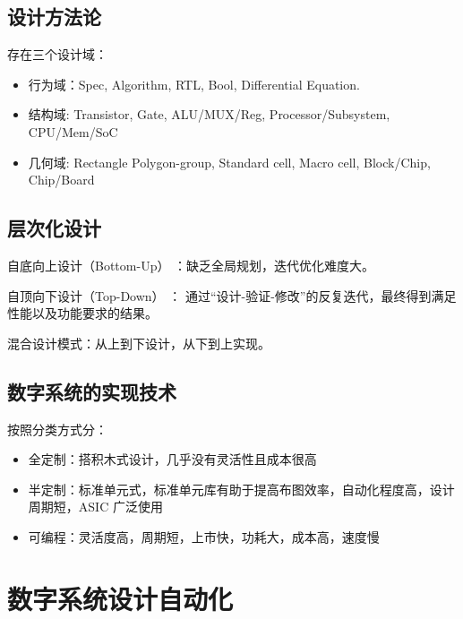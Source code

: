 \documentclass[cn,11pt,chinese,black,simple]{../elegantbook}
\begin{document}
\subsection{设计方法论}

存在三个设计域：

\begin{itemize}
    \item 行为域：Spec, Algorithm, RTL, Bool, Differential Equation.
    \item 结构域: Transistor, Gate, ALU/MUX/Reg, Processor/Subsystem, CPU/Mem/SoC 
    \item 几何域: Rectangle Polygon-group, Standard cell, Macro cell, Block/Chip, Chip/Board
\end{itemize}

\subsection{层次化设计}

自底向上设计（Bottom-Up） ：缺乏全局规划，迭代优化难度大。

自顶向下设计（Top-Down） ： 通过“设计-验证-修改”的反复迭代，最终得到满足性能以及功能要求的结果。

混合设计模式：从上到下设计，从下到上实现。

\subsection{数字系统的实现技术}

按照分类方式分：

\begin{itemize}
    \item 全定制：搭积木式设计，几乎没有灵活性且成本很高
    \item 半定制：标准单元式，标准单元库有助于提高布图效率，自动化程度高，设计周期短，ASIC 广泛使用
    \item 可编程：灵活度高，周期短，上市快，功耗大，成本高，速度慢
\end{itemize}

\section{数字系统设计自动化}

\let\chapname\undefined
\ifx\mainclass\undefined
\end{document}
